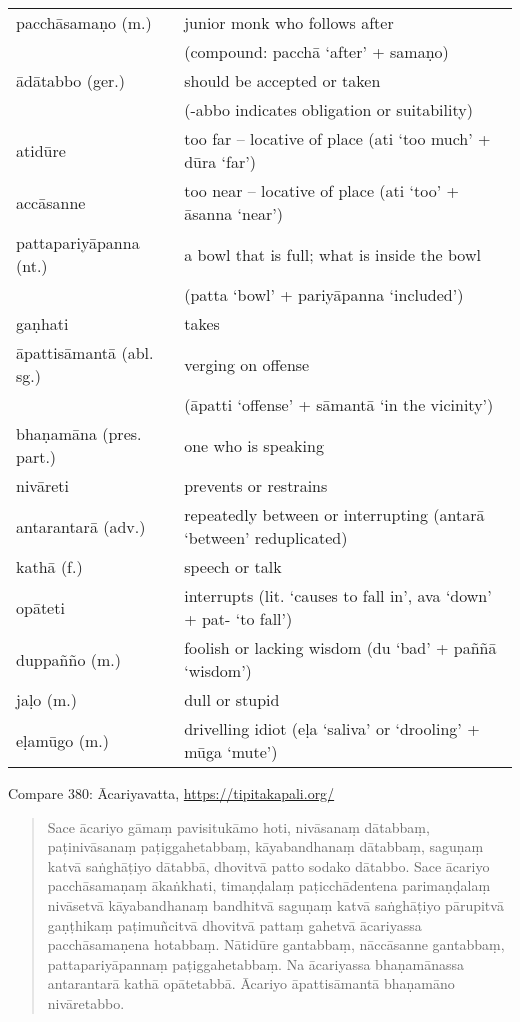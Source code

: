 \documentclass[11pt,oneside]{memoir}
\begin{document}
\begin{longtable}{L{\colOne} L{\colTwo+10mm}}
pacchāsamaṇo (m.) & junior monk who follows after\\[0pt]
 & (compound: pacchā `after' + samaṇo)\\[0pt]
ādātabbo (ger.) & should be accepted or taken\\[0pt]
 & (-abbo indicates obligation or suitability)\\[0pt]
atidūre & too far -- locative of place (ati `too much' + dūra `far')\\[0pt]
accāsanne & too near -- locative of place (ati `too' + āsanna `near')\\[0pt]
pattapariyāpanna (nt.) & a bowl that is full; what is inside the bowl\\[0pt]
 & (patta `bowl' + pariyāpanna `included')\\[0pt]
gaṇhati & takes\\[0pt]
āpattisāmantā (abl. sg.) & verging on offense\\[0pt]
 & (āpatti `offense' + sāmantā `in the vicinity')\\[0pt]
bhaṇamāna (pres. part.) & one who is speaking\\[0pt]
nivāreti & prevents or restrains\\[0pt]
antarantarā (adv.) & repeatedly between or interrupting (antarā `between' reduplicated)\\[0pt]
kathā (f.) & speech or talk\\[0pt]
opāteti & interrupts (lit. `causes to fall in', ava `down' + pat- `to fall')\\[0pt]
duppañño (m.) & foolish or lacking wisdom (du `bad' + paññā `wisdom')\\[0pt]
jaḷo (m.) & dull or stupid\\[0pt]
eḷamūgo (m.) & drivelling idiot (eḷa `saliva' or `drooling' + mūga `mute')\\[0pt]
\end{longtable}

\clearpage

Compare 380: Ācariyavatta, \href{https://tipitakapali.org/chapter/vin02m3.mul7}{https://tipitakapali.org/}

\begin{quote}
Sace ācariyo gāmaṃ pavisitukāmo hoti, nivāsanaṃ dātabbaṃ, paṭinivāsanaṃ
paṭiggahetabbaṃ, kāyabandhanaṃ dātabbaṃ, saguṇaṃ katvā saṅghāṭiyo dātabbā,
dhovitvā patto sodako dātabbo. Sace ācariyo pacchāsamaṇaṃ ākaṅkhati, timaṇḍalaṃ
paṭicchādentena parimaṇḍalaṃ nivāsetvā kāyabandhanaṃ bandhitvā saguṇaṃ katvā
saṅghāṭiyo pārupitvā gaṇṭhikaṃ paṭimuñcitvā dhovitvā pattaṃ gahetvā ācariyassa
pacchāsamaṇena hotabbaṃ. Nātidūre gantabbaṃ, nāccāsanne gantabbaṃ,
pattapariyāpannaṃ paṭiggahetabbaṃ. Na ācariyassa bhaṇamānassa antarantarā kathā
opātetabbā. Ācariyo āpattisāmantā bhaṇamāno nivāretabbo.
\end{quote}
\end{document}
